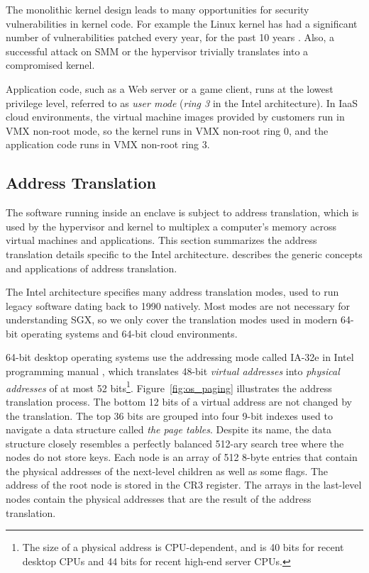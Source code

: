 The monolithic kernel design leads to many opportunities for security
vulnerabilities in kernel code. For example the Linux kernel has had a
significant number of vulnerabilities patched every year, for the past 10 years
\cite{cvedetails2014linux} \cite{chen2011linux}. Also, a successful attack on
SMM or the hypervisor trivially translates into a compromised kernel.

Application code, such as a Web server or a game client, runs at the lowest
privilege level, referred to as \textit{user mode} (\textit{ring 3} in the
Intel architecture). In IaaS cloud environments, the virtual machine images
provided by customers run in VMX non-root mode, so the kernel runs in VMX
non-root ring 0, and the application code runs in VMX non-root ring 3.


\subsection{Address Translation}
\label{sec:paging}

The software running inside an enclave is subject to address translation, which
is used by the hypervisor and kernel to multiplex a computer's memory across
virtual machines and applications. This section summarizes the address
translation details specific to the Intel architecture. \cite{jacob1998virtual}
describes the generic concepts and applications of address translation.

The Intel architecture specifies many address translation modes, used to run
legacy software dating back to 1990 natively. Most modes are not necessary for
understanding SGX, so we only cover the translation modes used in modern 64-bit
operating systems and 64-bit cloud environments.

64-bit desktop operating systems use the addressing mode called IA-32e in
Intel programming manual \cite{intel2014manual}, which translates 48-bit
\textit{virtual addresses} into \textit{physical addresses} of at most 52
bits\footnote{The size of a physical address is CPU-dependent, and is 40 bits
for recent desktop CPUs and 44 bits for recent high-end server CPUs.}.
Figure~\ref{fig:os_paging} illustrates the address translation process. The
bottom 12 bits of a virtual address are not changed by the translation. The top
36 bits are grouped into four 9-bit indexes used to navigate a data structure
called \textit{the page tables}. Despite its name, the data structure closely
resembles a perfectly balanced 512-ary search tree where the nodes do not store
keys. Each node is an array of 512 8-byte entries that contain the physical
addresses of the next-level children as well as some flags. The address of the
root node is stored in the CR3 register. The arrays in the last-level nodes
contain the physical addresses that are the result of the address translation.


